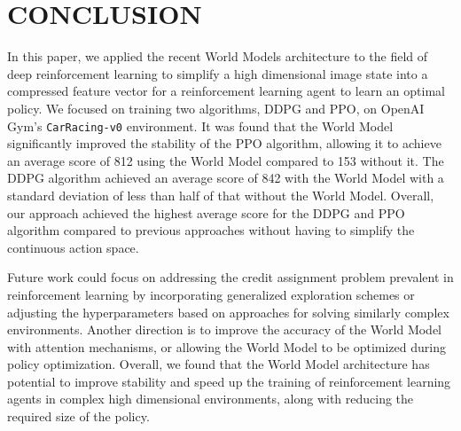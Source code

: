 \section{CONCLUSION}

In this paper, we applied the recent World Models architecture to the field of deep reinforcement learning to simplify a high dimensional image state into a compressed feature vector for a reinforcement learning agent to learn an optimal policy. We focused on training two algorithms, DDPG and PPO, on OpenAI Gym's \texttt{CarRacing-v0} environment. It was found that the World Model significantly improved the stability of the PPO algorithm, allowing it to achieve an average score of 812 using the World Model compared to 153 without it. The DDPG algorithm achieved an average score of 842 with the World Model with a standard deviation of less than half of that without the World Model. Overall, our approach achieved the highest average score for the DDPG and PPO algorithm compared to previous approaches without having to simplify the continuous action space.

Future work could focus on addressing the credit assignment problem prevalent in reinforcement learning by incorporating generalized exploration schemes or adjusting the hyperparameters based on approaches for solving similarly complex environments. Another direction is to improve the accuracy of the World Model with attention mechanisms, or allowing the World Model to be optimized during policy optimization. Overall, we found that the World Model architecture has potential to improve stability and speed up the training of reinforcement learning agents in complex high dimensional environments, along with reducing the required size of the policy.